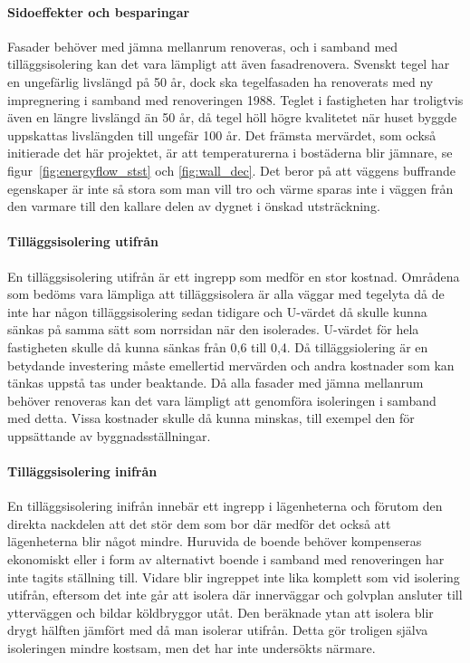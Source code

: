 \paragraph{Sidoeffekter och besparingar}
Fasader behöver med jämna mellanrum renoveras, och i samband med tilläggsisolering kan det vara lämpligt att även fasadrenovera. Svenskt tegel har en ungefärlig livslängd på 50 år\cite{magnus}, dock ska tegelfasaden ha renoverats med ny impregnering i samband med renoveringen 1988. Teglet i fastigheten har troligtvis även en längre livslängd än 50 år,  då tegel höll högre kvalitetet när huset byggde uppskattas livslängden till ungefär 100 år.
Det främsta mervärdet, som också initierade det här projektet, är att temperaturerna i bostäderna blir jämnare, se figur~\ref{fig:energyflow_stst} och \ref{fig:wall_dec}. 
Det beror på att väggens buffrande egenskaper är inte så stora som man vill tro och värme sparas inte i väggen från den varmare till den kallare delen av dygnet i önskad utsträckning.

\paragraph{Tilläggsisolering utifrån}
En tilläggsisolering utifrån är ett ingrepp som medför en stor kostnad. Områdena som bedöms vara lämpliga att tilläggsisolera är alla väggar med tegelyta då de inte har någon tilläggsisolering sedan tidigare och U-värdet då skulle kunna sänkas på samma sätt som norrsidan när den isolerades. U-värdet för hela fastigheten skulle då kunna sänkas från 0,6 till 0,4. Då tilläggsiolering är en betydande investering måste emellertid mervärden och andra kostnader som kan tänkas uppstå tas under beaktande. Då alla fasader med jämna mellanrum behöver renoveras kan det vara lämpligt att genomföra isoleringen i samband med detta. Vissa kostnader skulle då kunna minskas, till exempel den för uppsättande av byggnadsställningar.

\paragraph{Tilläggsisolering inifrån}
En tilläggsisolering inifrån innebär ett ingrepp i lägenheterna och förutom den direkta nackdelen att det stör dem som bor där medför det också att lägenheterna blir något mindre. Huruvida de boende behöver kompenseras ekonomiskt eller i form av alternativt boende i samband med renoveringen har inte tagits ställning till. Vidare blir ingreppet inte lika komplett som vid isolering utifrån, eftersom det inte går att isolera där innerväggar och golvplan ansluter till ytterväggen och bildar köldbryggor utåt. Den beräknade ytan att isolera blir drygt hälften jämfört med då man isolerar utifrån. Detta gör troligen själva isoleringen mindre kostsam, men det har inte undersökts närmare.

